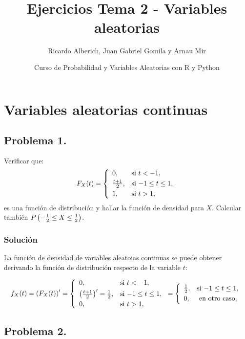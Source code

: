 \documentclass[
]{article}
\title{Ejercicios Tema 2 - Variables aleatorias}
\author{Ricardo Alberich, Juan Gabriel Gomila y Arnau Mir}
\date{Curso de Probabilidad y Variables Aleatorias con R y Python}
\begin{document}
\maketitle

{
\hypersetup{linkcolor=blue}
\setcounter{tocdepth}{4}
\tableofcontents
}
\hypertarget{variables-aleatorias-continuas}{%
\section{Variables aleatorias
continuas}\label{variables-aleatorias-continuas}}

\hypertarget{problema-1.}{%
\subsection{Problema 1.}\label{problema-1.}}

Verificar que: \[
F_X (t)=
\left\{\begin{array}{ll}
0, & \mbox{si $t<-1$},
 \\[0.1cm]
{t+1\over 2}, & \mbox{si $-1\leq
t\leq 1$},
 \\[0.1cm]
1, & \mbox{si $t> 1$},
\end{array}\right.
\] es una función de distribución y hallar la función de densidad para
\(X\). Calcular también
\(P\left(-{1\over 2}\leq X\leq {1\over 2}\right)\).

\hypertarget{soluciuxf3n}{%
\subsubsection{Solución}\label{soluciuxf3n}}

La función de densidad de variables aleatoias continuas se puede obtener
derivando la función de distribución respecto de la variable \(t\):

\[
f_X(t)=\left(F_X (t)\right)'=
\left\{\begin{array}{ll}
0, & \mbox{si $t<-1$},
 \\[0.1cm]
\left({t+1\over 2}\right)'=\frac12, & \mbox{si $-1\leq
t\leq 1$},
 \\[0.1cm]
0, & \mbox{si $t> 1$},
\end{array}\right.=
\left\{\begin{array}{ll}
\frac12, & \mbox{si $-1\leq
t\leq 1$},
 \\[0.1cm]
0, & \mbox{ en otro caso},
\end{array}\right.
\]

\hypertarget{problema-2.}{%
\subsection{Problema 2.}\label{problema-2.}}
\end{document}

